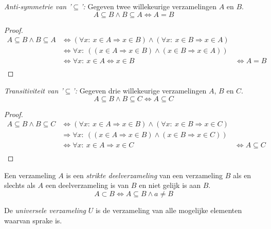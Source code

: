 \documentclass[main.tex]{subfiles}
\begin{document}
\begin{st}
  \emph{Anti-symmetrie van '$\subseteq$':} Gegeven twee willekeurige verzamelingen $A$ en $B$.
  \[ A \subseteq B \wedge B \subseteq A  \Leftrightarrow A = B \]
  \begin{proof}
    \[
    \begin{array}{cll}
      A \subseteq B \wedge B \subseteq A &\Leftrightarrow (\forall x:\ x \in A \Rightarrow x \in B) \wedge (\forall x:\ x \in B \Rightarrow x \in A) &\\
      & \Leftrightarrow \forall x:\ ((x \in A \Rightarrow x \in B) \wedge (x \in B \Rightarrow x \in A)) &\\
      & \Leftrightarrow \forall x:\ x \in A \Leftrightarrow x \in B &\Leftrightarrow A = B  \\
    \end{array}
    \]
  \end{proof}
\end{st}

\begin{st}
  \emph{Transitiviteit van '$\subseteq$':} Gegeven drie willekeurige verzamelingen $A$, $B$ en $C$.
  \[ A \subseteq B \wedge B \subseteq C  \Leftrightarrow A \subseteq C \]
  \begin{proof}
    \[
    \begin{array}{cll}
      A \subseteq B \wedge B \subseteq C &\Leftrightarrow (\forall x:\ x \in A \Rightarrow x \in B) \wedge (\forall x:\ x \in B \Rightarrow x \in C) &\\
      & \Rightarrow \forall x:\ ((x \in A \Rightarrow x \in B) \wedge (x \in B \Rightarrow x \in C)) &\\
      & \Leftrightarrow \forall x:\ x \in A \Rightarrow x \in C &\Leftrightarrow A \subseteq C  \\
    \end{array}
    \]
  \end{proof}
\end{st}

\begin{de}
  Een verzameling $A$ is een \emph{strikte deelverzameling} van een verzameling $B$ als en slechts als $A$ een deelverzameling is van $B$ en niet gelijk is aan $B$.
  \[ A \subset B \Leftrightarrow A \subseteq B \wedge a \neq B \]
\end{de}

\begin{de}
  De \emph{universele verzameling} $U$ is de verzameling van alle mogelijke elementen waarvan sprake is.
\end{de}
\end{document}
